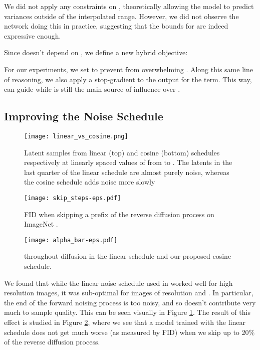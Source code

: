 \documentclass{article}
\begin{document}
We did not apply any constraints on , theoretically allowing the model to predict variances outside of the interpolated range. However, we did not observe the network doing this in practice, suggesting that the bounds for  are indeed expressive enough.

Since  doesn't depend on , we define a new hybrid objective:


For our experiments, we set  to prevent  from overwhelming . Along this same line of reasoning, we also apply a stop-gradient to the  output for the  term. This way,  can guide  while  is still the main source of influence over .

\subsection{Improving the Noise Schedule}
\label{sec:schedule}

\begin{figure}[t]
\begin{center}
\centerline{\texttt{[image: linear\_vs\_cosine.png]}}
\caption{\label{fig:noisingprocess} Latent samples from linear (top) and cosine (bottom) schedules respectively at linearly spaced values of  from  to . The latents in the last quarter of the linear schedule are almost purely noise, whereas the cosine schedule adds noise more slowly}
\end{center}
\vskip -0.2in
\end{figure}

\begin{figure}[t]
\begin{center}
\centerline{\texttt{[image: skip\_steps-eps.pdf]}}
\caption{\label{fig:skipsteps} FID when skipping a prefix of the reverse diffusion process on ImageNet .}
\end{center}
\end{figure}

\begin{figure}[ht]
\begin{center}
\centerline{\texttt{[image: alpha\_bar-eps.pdf]}}
\caption{\label{fig:alphabar}  throughout diffusion in the linear schedule and our proposed cosine schedule.}
\end{center}
\vskip -0.2in
\end{figure}



We found that while the linear noise schedule used in \citet{ddpm} worked well for high resolution images, it was sub-optimal for images of resolution  and . In particular, the end of the forward noising process is too noisy, and so doesn't contribute very much to sample quality. This can be seen visually in Figure \ref{fig:noisingprocess}. The result of this effect is studied in Figure \ref{fig:skipsteps}, where we see that a model trained with the linear schedule does not get much worse (as measured by FID) when we skip up to 20\% of the reverse diffusion process.
\end{document}
